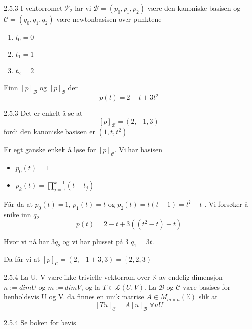 \documentclass[a4paper,norsk]{article}
\begin{document}
\begin{oppgavebox}{2.5.3}{}
I vektorromet $ \mathcal{P}_2 $ lar vi $ \mathcal{B}= \left( p_0, p_1, p_2 \right)  $ være den kanoniske basisen og $ \mathcal{C} = \left( q_0, q_1, q_2 \right)  $ være newtonbasisen over punktene 
\begin{enumerate}
  \item $ t_0 = 0 $
  \item $ t_1 = 1 $
  \item $ t_2 = 2 $   
\end{enumerate} 
Finn $ \left[ p \right] _{\mathcal{B}} $ og $ \left[ p \right] _{\mathcal{B}} $  der 
\[
    p(t) = 2 - t + 3t^2
\]
\begin{proofbox}{2.5.3}{}
Det er enkelt å se at
\[
    \left[ p \right] _{\mathcal{B}} = \left( 2, -1, 3 \right) 
\]
fordi den kanoniske basisen er $ \left( 1, t, t^2 \right)  $ 


Er egt ganske enkelt å løse for $ \left[ p \right] _{\mathcal{C}} $. Vi har basisen

\begin{itemize}
  \item $ p_0(t) = 1 $
  \item $ p_k(t) = \prod_{j=0}^{k-1} \left( t - t_j \right)  $  
\end{itemize}
Får da at $ p_0(t) = 1 $, $ p_1(t) = t $ og $ p_2(t) = t \left( t-1 \right) = t^2 - t  $  . Vi forsøker å snike inn $ q_2 $ 
\[
    p(t) = 2 - t + 3 \left( \left( t^2 - t \right) + t  \right) 
\]

Hvor vi nå har $ 3q_2 $ og vi har plusset på 3 $ q_1 = 3t $.

Da får vi at $ \left[ p \right] _{\mathcal{C}} = \left( 2, -1 + 3, 3 \right) = \left( 2, 2, 3 \right)  $ 


 
\end{proofbox}
\end{oppgavebox}

\begin{theorembox}{2.5.4}{}
La U, V være ikke-trivielle vektorrom over $ \mathbb{K} $ av endelig dimensjon $ n:=dimU $ og $ m:=dimV $, og la $ T \in \mathcal{L} \left( U, V \right)  $. La $ \mathcal{B} $ og $ \mathcal{C} $ være basises for henholdsvis U og V. da finnes en unik matrise $ A \in  M_{m \times n} (\mathbb{K}) $ slik at
\[
    \left[ Tu \right] _{\mathcal{C}} = A \left[ u \right] _{\mathcal{B}} \; \forall u  U
\]
\begin{proofbox}{2.5.4}{}
Se boken for bevis
\end{proofbox}
\end{theorembox}
\end{document}
